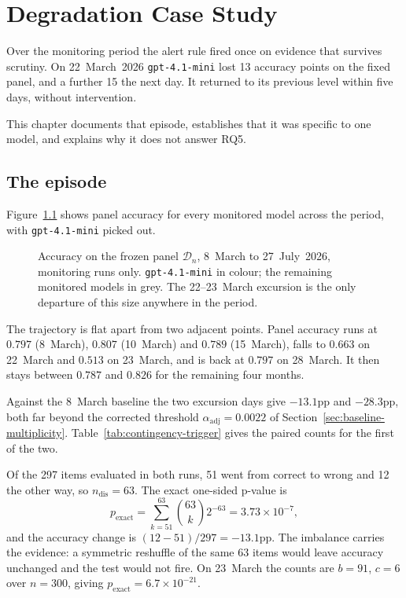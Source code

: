 \chapter{Degradation Case Study}
\label{chap:degradation-case-study}

Over the monitoring period the alert rule fired once on evidence that survives scrutiny. On 22~March~2026 \texttt{gpt-4.1-mini} lost 13 accuracy points on the fixed panel, and a further 15 the next day. It returned to its previous level within five days, without intervention.

This chapter documents that episode, establishes that it was specific to one model, and explains why it does not answer RQ5.

\section{The episode}
\label{sec:alerted-degradation-case}

Figure~\ref{fig:panel-trajectory} shows panel accuracy for every monitored model across the period, with \texttt{gpt-4.1-mini} picked out.

\begin{figure}[htbp]
    \centering
    
    \caption{Accuracy on the frozen panel $\mathcal{D}_n$, 8~March to 27~July~2026, monitoring runs only. \texttt{gpt-4.1-mini} in colour; the remaining monitored models in grey. The 22--23~March excursion is the only departure of this size anywhere in the period.}
    \label{fig:panel-trajectory}
\end{figure}

The trajectory is flat apart from two adjacent points. Panel accuracy runs at $0.797$ (8~March), $0.807$ (10~March) and $0.789$ (15~March), falls to $0.663$ on 22~March and $0.513$ on 23~March, and is back at $0.797$ on 28~March. It then stays between $0.787$ and $0.826$ for the remaining four months.

Against the 8~March baseline the two excursion days give $-13.1$pp and $-28.3$pp, both far beyond the corrected threshold $\alpha_{\mathrm{adj}}=0.0022$ of Section~\ref{sec:baseline-multiplicity}. Table~\ref{tab:contingency-trigger} gives the paired counts for the first of the two.



Of the 297 items evaluated in both runs, 51 went from correct to wrong and 12 the other way, so $n_{\mathrm{dis}}=63$. The exact one-sided p-value is
\[
p_{\mathrm{exact}}=\sum_{k=51}^{63}\binom{63}{k}2^{-63}=3.73\times10^{-7},
\]
and the accuracy change is $(12-51)/297=-13.1$pp. The imbalance carries the evidence: a symmetric reshuffle of the same 63 items would leave accuracy unchanged and the test would not fire. On 23~March the counts are $b=91$, $c=6$ over $n=300$, giving $p_{\mathrm{exact}}=6.7\times10^{-21}$.

